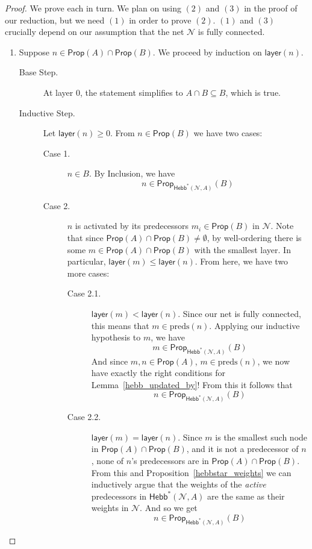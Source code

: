 \documentclass[letterpaper]{article}
\theoremstyle{definition}
\newcommand{\preds}[1]{\mbox{preds}(#1)}
\newcommand{\layer}[1]{\mathsf{layer}(#1)}
\newcommand{\Net}{\mathcal{N}}
\newcommand{\Prop}{\textsf{Prop}}
\newcommand{\Hebbstar}[2]{\textsf{Hebb}^*(#1, #2)}
\begin{document}
\begin{proof}
    We prove each in turn.  We plan on using $(2)$ and $(3)$ in the proof of our reduction, but we need $(1)$ in order to prove $(2)$.  $(1)$ and $(3)$ crucially depend on our assumption that the net $\Net$ is fully connected.
    \begin{enumerate}
        
        \item 
        Suppose $n \in \Prop(A) \cap \Prop(B)$.  We proceed by induction on $\layer{n}$.
        \begin{description}
            \item[Base Step.] At layer $0$, the statement simplifies to $A \cap B \subseteq B$, which is true.
            \item[Inductive Step.] Let $\layer{n} \geq 0$.
            From $n \in \Prop(B)$ we have two cases:
            \begin{description}
                \item[Case 1.] $n \in B$.  By Inclusion, we have
                \[ n \in \Prop_{\Hebbstar{\Net}{A}}(B) \]
                
                \item[Case 2.] $n$ is activated by its predecessors $m_i \in \Prop(B)$ in $\Net$.  Note that since $\Prop(A) \cap \Prop(B) \not = \emptyset$, by well-ordering there is some $m \in \Prop(A) \cap \Prop(B)$ with the smallest layer.  In particular, $\layer{m} \leq \layer{n}$.  From here, we have two more cases:

                \begin{description}
                    \item[Case 2.1.] $\layer{m} < \layer{n}$.  Since our net is fully connected, this means that $m \in \preds{n}$.  Applying our inductive hypothesis to $m$, we have
                    \[
                        m \in \Prop_{\Hebbstar{\Net}{A}}(B)
                    \]
                    And since $m, n \in \Prop(A)$, $m \in \preds{n}$, we now have exactly the right conditions for Lemma~\ref{hebb_updated_by}!  From this it follows that
                    \[
                        n \in \Prop_{\Hebbstar{\Net}{A}}(B)
                    \]
                    
                    \item[Case 2.2.] $\layer{m} = \layer{n}$.
                    Since $m$ is the smallest such node in $\Prop(A) \cap \Prop(B)$, and it is not a predecessor of $n$, none of $n$'s predecessors are in $\Prop(A) \cap \Prop(B)$.  From this and Proposition~\ref{hebbstar_weights} we can inductively argue that the weights of the \emph{active} predecessors in $\Hebbstar{\Net}{A}$ are the same as their weights in $\Net$.  And so we get 
                    \[
                        n \in \Prop_{\Hebbstar{\Net}{A}}(B)
                    \]
                \end{description}
            \end{description}
        \end{description}


\end{enumerate}
\end{proof}
\end{document}
